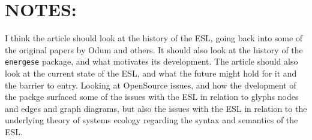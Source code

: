 \section{NOTES:}

I think the article should look at the history of the ESL, going back into some of the original papers by Odum and others. It should also look at the history of the \texttt{energese} package, and what motivates its development. The article should also look at the current state of the ESL, and what the future might hold for it and the barrier to entry. Looking at OpenSource issues, and how the dvelopment of the packge surfaced some of the issues with the ESL in relation to glyphs nodes and edges and graph diagrams, but also the issues with the ESL in relation to the underlying theory of systems ecology regarding the syntax and semantics of the ESL. 

